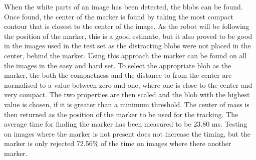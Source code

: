 When the white parts of an image has been detected, the blobs can be found.
Once found, the center of the marker is found by taking the most compact contour that is closest to the center of the image.
As the robot will be following the position of the marker, this is a good estimate, but it also proved to be good in the images used in the test set as the distracting blobs were not placed in the center, behind the marker.
Using this approach the marker can be found on all the images in the easy and hard set.
To select the appropriate blob as the marker, the both the compactness and the distance to from the center are normalised to a value between zero and one, where one is close to the center and very compact.
The two properties are then scaled and the blob with the highest value is chosen, if it is greater than a minimum threshold.
The center of mass is then returned as the position of the marker to be used for the tracking.
The average time for finding the marker has been measured to be 23.80 ms.
Testing on images where the marker is not present does not increase the timing, but the marker is only rejected 72.56\% of the time on images where there another marker.

